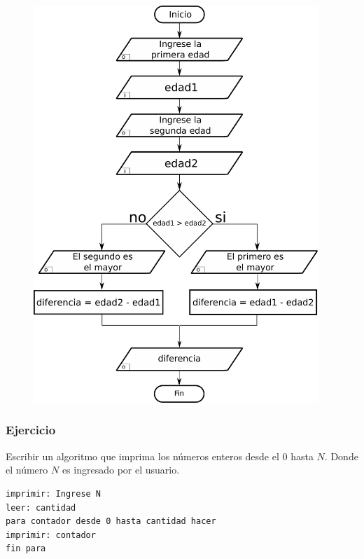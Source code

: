 \begin{figure}[h!]
  \centering
  \includegraphics[height=150mm]{./img/ejercicio_2.pdf} 
\end{figure}

\pagebreak

\subsubsection{Ejercicio}
Escribir un algoritmo que imprima los números enteros desde el 0 hasta $N$. Donde el número $N$ es ingresado por el usuario.

\begin{lstlisting}[style=pseudocodigo]
imprimir: Ingrese N
leer: cantidad
para contador desde 0 hasta cantidad hacer
imprimir: contador
fin para
\end{lstlisting}

